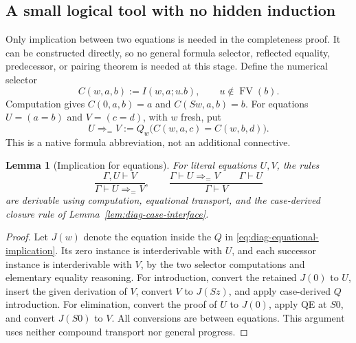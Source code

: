 \documentclass[11pt]{article}
\newtheorem{lemma}[theorem]{Lemma}
\theoremstyle{definition}
\theoremstyle{remark}
\begin{document}
\subsection{A small logical tool with no hidden induction}

Only implication between two equations is needed in the completeness
proof.  It can be constructed directly, so no general formula selector,
reflected equality, predecessor, or pairing theorem is needed at this
stage.  Define the numerical selector
\[
 C(w,a,b):=I(w,a;u.b),\qquad u\notin\operatorname{FV}(b).
\]
Computation gives $C(0,a,b)=a$ and $C(Sw,a,b)=b$.
For equations $U=(a=b)$ and $V=(c=d)$, with $w$ fresh, put
\begin{equation}
 U\Rightarrow_{=}V
   :=Q_w\bigl(C(w,a,c)=C(w,b,d)\bigr).
 \label{eq:diag-equational-implication}
\end{equation}
This is a native formula abbreviation, not an additional connective.

\begin{lemma}[Implication for equations]
\label{lem:diag-eq-implication}
For literal equations $U,V$, the rules
\[
 \frac{\Gamma,U\vdash V}{\Gamma\vdash U\Rightarrow_{=}V},
 \qquad
 \frac{\Gamma\vdash U\Rightarrow_{=}V\qquad\Gamma\vdash U}
      {\Gamma\vdash V}
\]
are derivable using computation, equational transport, and the
case-derived closure rule of Lemma~\ref{lem:diag-case-interface}.
\end{lemma}
\begin{proof}
Let $J(w)$ denote the equation inside the $Q$ in
\eqref{eq:diag-equational-implication}.
Its zero instance is interderivable with $U$, and each successor
instance is interderivable with $V$, by the two selector computations
and elementary equality reasoning.
For introduction, convert the retained $J(0)$ to $U$, insert the given
derivation of $V$, convert $V$ to $J(Sz)$, and apply case-derived
$Q$ introduction.  For elimination, convert the proof of $U$ to
$J(0)$, apply QE at $S0$, and convert $J(S0)$ to $V$.
All conversions are between equations.  This argument uses neither
compound transport nor general progress.
\end{proof}
\end{document}
